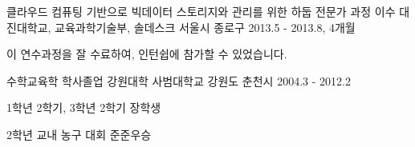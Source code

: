 

\begin{cventries}

  \cventry
    {클라우드 컴퓨팅 기반으로 빅데이터 스토리지와 관리를 위한 하둡 전문가 과정 이수} %
    {대진대학교, 교육과학기술부, 솔데스크} %
    {서울시 종로구} %
    {2013.5 - 2013.8, 4개월} %
    {
      \begin{cvitems} %
        \item {이 연수과정을 잘 수료하여, 인턴쉽에 참가할 수 있었습니다.}
      \end{cvitems}
    }

  \cventry
    {수학교육학 학사졸업} %
    {강원대학 사범대학교} %
    {강원도 춘천시} %
    {2004.3 - 2012.2} %
    {
      \begin{cvitems} %
        \item {1학년 2학기, 3학년 2학기 장학생}
        \item {2학년 교내 농구 대회 준준우승}
      \end{cvitems}
    }

\end{cventries}
